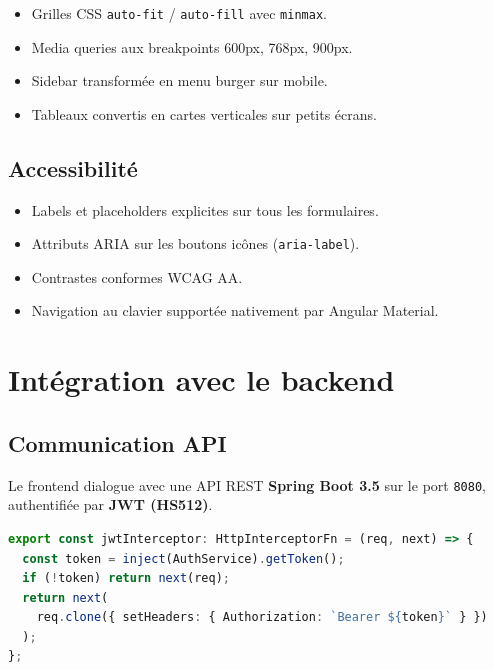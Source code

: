 \documentclass[11pt,a4paper]{article}
\begin{document}
\begin{itemize}
  \item Grilles CSS \texttt{auto-fit} / \texttt{auto-fill} avec \texttt{minmax}.
  \item Media queries aux breakpoints 600px, 768px, 900px.
  \item Sidebar transformée en menu burger sur mobile.
  \item Tableaux convertis en cartes verticales sur petits écrans.
\end{itemize}

\subsection{Accessibilité}

\begin{itemize}
  \item Labels et placeholders explicites sur tous les formulaires.
  \item Attributs ARIA sur les boutons icônes (\texttt{aria-label}).
  \item Contrastes conformes WCAG AA.
  \item Navigation au clavier supportée nativement par Angular Material.
\end{itemize}

\newpage

\section{Intégration avec le backend}

\subsection{Communication API}

Le frontend dialogue avec une API REST \textbf{Spring Boot 3.5} sur le port
\texttt{8080}, authentifiée par \textbf{JWT (HS512)}.

\begin{lstlisting}[language=TypeScript, caption={Intercepteur JWT}]
export const jwtInterceptor: HttpInterceptorFn = (req, next) => {
  const token = inject(AuthService).getToken();
  if (!token) return next(req);
  return next(
    req.clone({ setHeaders: { Authorization: `Bearer ${token}` } })
  );
};
\end{lstlisting}
\end{document}
